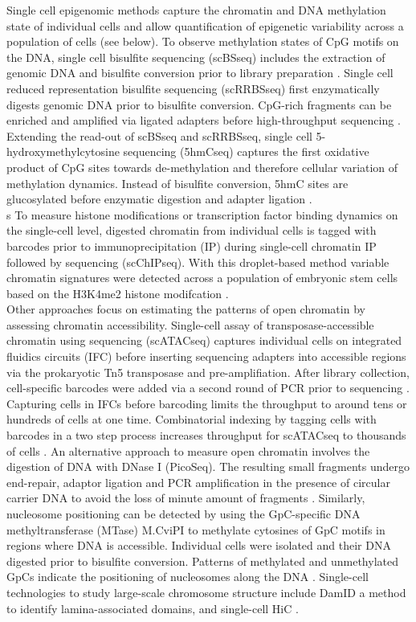 Single cell epigenomic methods capture the chromatin and DNA methylation state of individual cells and allow quantification of epigenetic variability across a population of cells (see below)\citep{Clark2016}. To observe methylation states of CpG motifs on the DNA, single cell bisulfite sequencing (scBSseq) includes the extraction of genomic DNA and bisulfite conversion prior to library preparation \citep{Smallwood2014, Farlik2015}. Single cell reduced representation bisulfite sequencing (scRRBSseq) first enzymatically digests genomic DNA prior to bisulfite conversion. CpG-rich fragments can be enriched and amplified via ligated adapters before high-throughput sequencing \citep{Guo2013}. Extending the read-out of scBSseq and scRRBSseq, single cell 5-hydroxymethylcytosine sequencing (5hmCseq) captures the first oxidative product of CpG sites towards de-methylation and therefore cellular variation of methylation dynamics. Instead of bisulfite conversion, 5hmC sites are glucosylated before enzymatic digestion and adapter ligation \citep{Mooijman2016}. \\s
To measure histone modifications or transcription factor binding dynamics on the single-cell level, digested chromatin from individual cells is tagged with barcodes prior to immunoprecipitation (IP) during single-cell chromatin IP followed by sequencing (scChIPseq). With this droplet-based method variable chromatin signatures were detected across a population of embryonic stem cells based on the H3K4me2 histone modifcation \citep{Rotem2015}. \\ 
Other approaches focus on estimating the patterns of open chromatin by assessing chromatin accessibility. Single-cell assay of transposase-accessible chromatin using sequencing (scATACseq) captures individual cells on integrated fluidics circuits (IFC) before inserting sequencing adapters into accessible regions via the prokaryotic Tn5 transposase and pre-amplifiation. After library collection, cell-specific barcodes were added via a second round of PCR prior to sequencing \citep{Buenrostro2015}.  Capturing cells in IFCs before barcoding limits the throughput to around tens or hundreds of cells at one time. Combinatorial indexing by tagging cells with barcodes in a two step process increases throughput for scATACseq to thousands of cells \citep{Cusanovich2015}. An alternative approach to measure open chromatin involves the digestion of DNA with DNase I (PicoSeq). The resulting small fragments undergo end-repair, adaptor ligation and PCR amplification in the presence of circular carrier DNA to avoid the loss of minute amount of fragments \citep{Jin2015}. Similarly, nucleosome positioning can be detected by using the GpC-specific DNA methyltransferase (MTase) M.CviPI to methylate cytosines of GpC motifs in regions where DNA is accessible. Individual cells were isolated and their DNA digested prior to bisulfite conversion. Patterns of methylated and unmethylated GpCs indicate the positioning of nucleosomes along the DNA \citep{Small2014}.
Single-cell technologies to study large-scale chromosome structure include DamID \citep{Kind2015} a method to identify lamina-associated domains, and single-cell HiC \citep{Nagano2013}.\\

